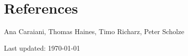 \documentclass[12pt]{article} %
\begin{document}
\section*{References}

Ana Caraiani, Thomas Haines, Timo Richarz, Peter Scholze
 






\vfill %


\begin{center}
	\scriptsize
	Last updated: \today
\end{center}

\end{document}
